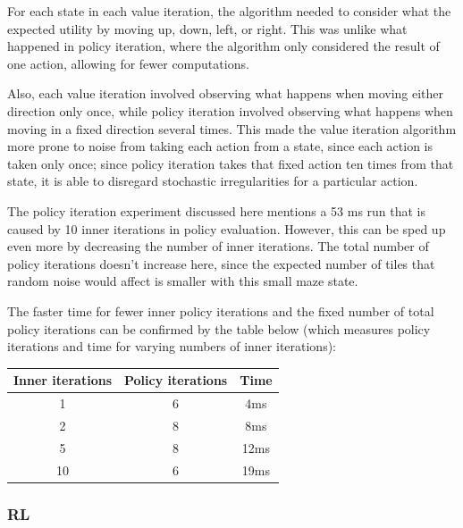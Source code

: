\documentclass[11pt]{article}
\begin{document}
            For each state in each value iteration, the algorithm needed to consider
            what the expected utility by moving up, down, left, or right. This was
            unlike what happened in policy iteration, where the algorithm only considered
            the result of one action, allowing for fewer computations.
            
            Also, each value iteration involved observing what happens when moving either direction only once,
            while policy iteration involved observing what happens when moving in a fixed direction several times.
            This made the value iteration algorithm more prone to noise from taking each action
            from a state, since each action is taken only once; since policy iteration takes that fixed action
            ten times from that state, it is able to disregard stochastic irregularities for a particular
            action.

            The policy iteration experiment discussed here mentions a 53 ms run that is caused by
            10 inner iterations in policy evaluation. However, this can be sped up even more by
            decreasing the number of inner iterations. The total number of policy iterations doesn't
            increase here, since the expected number of tiles that random noise would affect is
            smaller with this small maze state.

            The faster time for fewer inner policy iterations and the fixed number of total policy
            iterations can be confirmed by the table below (which measures policy iterations
            and time for varying numbers of inner iterations):

            \begin{tabular}{c c c}
                Inner iterations & Policy iterations & Time \\ \hline
                1 & 6 & 4ms \\ \hline
                2 & 8 & 8ms \\ \hline
                5 & 8 & 12ms \\ \hline
                10 & 6 & 19ms \\ \hline

            \end{tabular}


            \subsubsection{RL}
\end{document}
